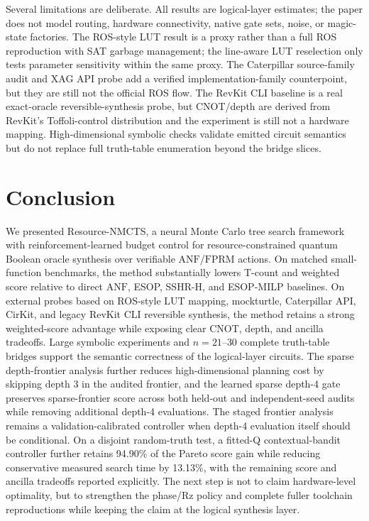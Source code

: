 \documentclass[11pt]{article}
\newcommand{\method}{Resource-NMCTS}
\newcommand{\anf}{\ensuremath{\mathrm{ANF}}}
\newcommand{\fprm}{\ensuremath{\mathrm{FPRM}}}
\begin{document}
\begin{table}[H]
\centering
\scriptsize
\setlength{\tabcolsep}{2pt}
\renewcommand{\arraystretch}{1.05}
\caption{Threats-to-validity and mitigation audit.  Each row names a reviewer
risk, points to the generated evidence that mitigates it, and preserves the
residual boundary that the current experiments do not cross.}
\label{tab:threats-validity}

\end{table}

Several limitations are deliberate.  All results are logical-layer estimates;
the paper does not model routing, hardware connectivity, native gate sets,
noise, or magic-state factories.  The ROS-style LUT result is a proxy rather
than a full ROS reproduction with SAT garbage management; the line-aware LUT
reselection only tests parameter sensitivity within the same proxy.  The
Caterpillar source-family audit and XAG API probe add a verified
implementation-family counterpoint, but they are still not the official ROS
flow.  The RevKit CLI baseline is a real exact-oracle reversible-synthesis
probe, but CNOT/depth are derived from RevKit's Toffoli-control distribution
and the experiment is still not a hardware mapping.  High-dimensional symbolic checks validate
emitted circuit semantics but do not replace full truth-table enumeration
beyond the bridge slices.

\section{Conclusion}

We presented \method{}, a neural Monte Carlo tree search framework with
reinforcement-learned budget control for
resource-constrained quantum Boolean oracle synthesis over verifiable
\anf{}/\fprm{} actions.  On matched small-function benchmarks, the method
substantially lowers T-count and weighted score relative to direct \anf{},
ESOP, SSHR-H, and ESOP-MILP baselines.  On external probes based on
ROS-style LUT mapping, mockturtle, Caterpillar API, CirKit, and legacy RevKit
CLI reversible synthesis, the method retains a strong weighted-score advantage
while exposing clear CNOT, depth, and ancilla tradeoffs.  Large symbolic experiments and
$n=21$--$30$ complete truth-table bridges support the semantic correctness of
the logical-layer circuits.  The sparse depth-frontier analysis further reduces
high-dimensional planning cost by skipping depth 3 in the audited frontier, and
the learned sparse depth-4 gate preserves sparse-frontier score across both
held-out and independent-seed audits while removing additional depth-4
evaluations.  The staged frontier analysis remains a validation-calibrated
controller when depth-4 evaluation itself should be conditional.  On a
disjoint random-truth test, a fitted-Q contextual-bandit controller further
retains 94.90\% of the Pareto score gain while reducing conservative measured
search time by 13.13\%, with the remaining score and ancilla tradeoffs reported
explicitly.  The next step is not to
claim hardware-level
optimality, but to strengthen the phase/Rz policy and complete fuller
toolchain reproductions while keeping the claim at the logical synthesis
layer.
\end{document}

